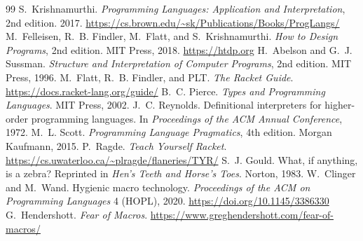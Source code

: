 \documentclass[11pt,oneside]{report}
\begin{document}
\tableofcontents










\begin{thebibliography}{99}
 S.~Krishnamurthi. \emph{Programming Languages: Application and Interpretation}, 2nd edition. 2017. \url{https://cs.brown.edu/~sk/Publications/Books/ProgLangs/}
 M.~Felleisen, R.~B. Findler, M.~Flatt, and S.~Krishnamurthi. \emph{How to Design Programs}, 2nd edition. MIT Press, 2018. \url{https://htdp.org}
 H.~Abelson and G.~J. Sussman. \emph{Structure and Interpretation of Computer Programs}, 2nd edition. MIT Press, 1996.
 M.~Flatt, R.~B. Findler, and PLT. \emph{The Racket Guide}. \url{https://docs.racket-lang.org/guide/}
 B.~C. Pierce. \emph{Types and Programming Languages}. MIT Press, 2002.
 J.~C. Reynolds. Definitional interpreters for higher-order programming languages. In \emph{Proceedings of the ACM Annual Conference}, 1972.
 M.~L. Scott. \emph{Programming Language Pragmatics}, 4th edition. Morgan Kaufmann, 2015.
 P.~Ragde. \emph{Teach Yourself Racket}. \url{https://cs.uwaterloo.ca/~plragde/flaneries/TYR/}
 S.~J. Gould. What, if anything, is a zebra? Reprinted in \emph{Hen's Teeth and Horse's Toes}. Norton, 1983.
 W.~Clinger and M.~Wand. Hygienic macro technology. \emph{Proceedings of the ACM on Programming Languages} 4 (HOPL), 2020. \url{https://doi.org/10.1145/3386330}
 G.~Hendershott. \emph{Fear of Macros}. \url{https://www.greghendershott.com/fear-of-macros/}
\end{thebibliography}
\end{document}
